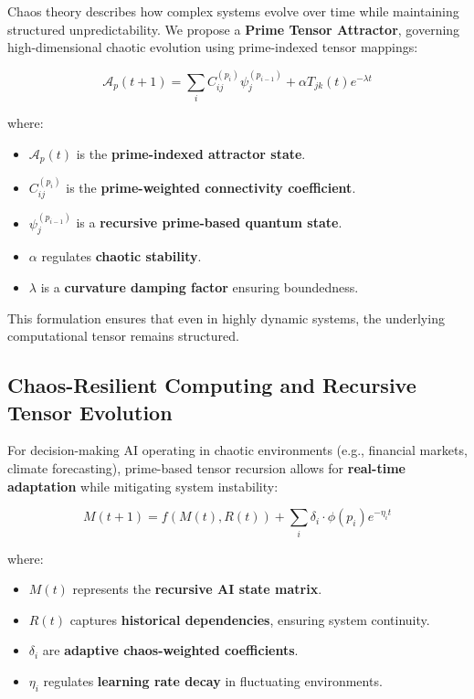 \documentclass{article}
\theoremstyle{plain}
\theoremstyle{plain}
\theoremstyle{definition}
\theoremstyle{remark}
\begin{document}
Chaos theory describes how complex systems evolve over time while maintaining structured unpredictability. We propose a \textbf{Prime Tensor Attractor}, governing high-dimensional chaotic evolution using prime-indexed tensor mappings:

\begin{equation}
\mathcal{A}_p (t+1) = \sum_{i} C_{ij}^{(p_i)} \psi_j^{(p_{i-1})} + \alpha T_{jk} (t) e^{- \lambda t}
\end{equation}

where:
\begin{itemize}
    \item $\mathcal{A}_p (t)$ is the \textbf{prime-indexed attractor state}.
    \item $C_{ij}^{(p_i)}$ is the \textbf{prime-weighted connectivity coefficient}.
    \item $\psi_j^{(p_{i-1})}$ is a \textbf{recursive prime-based quantum state}.
    \item $\alpha$ regulates \textbf{chaotic stability}.
    \item $\lambda$ is a \textbf{curvature damping factor} ensuring boundedness.
\end{itemize}

This formulation ensures that even in highly dynamic systems, the underlying computational tensor remains structured.

\subsection{Chaos-Resilient Computing and Recursive Tensor Evolution}

For decision-making AI operating in chaotic environments (e.g., financial markets, climate forecasting), prime-based tensor recursion allows for \textbf{real-time adaptation} while mitigating system instability:

\begin{equation}
M(t+1) = f(M(t), R(t)) + \sum_{i} \delta_i \cdot \phi(p_i) e^{- \eta_i t}
\end{equation}

where:
\begin{itemize}
    \item $M(t)$ represents the \textbf{recursive AI state matrix}.
    \item $R(t)$ captures \textbf{historical dependencies}, ensuring system continuity.
    \item $\delta_i$ are \textbf{adaptive chaos-weighted coefficients}.
    \item $\eta_i$ regulates \textbf{learning rate decay} in fluctuating environments.
\end{itemize}
\end{document}

